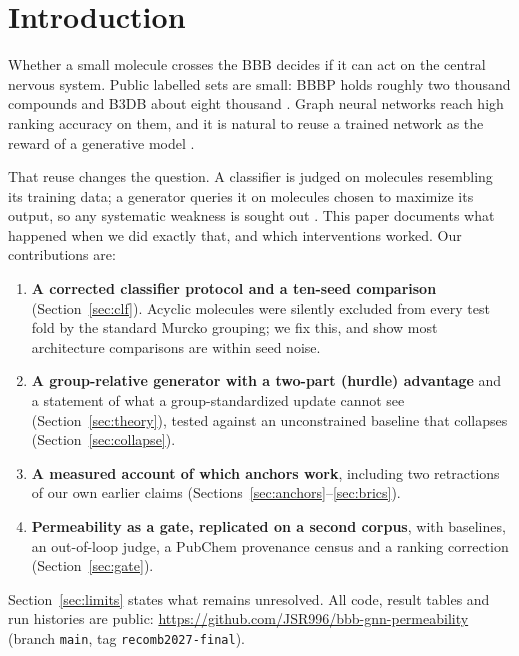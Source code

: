 \documentclass[10pt,letterpaper]{article}
\newcommand{\REPO}{\url{https://github.com/JSR996/bbb-gnn-permeability}}
\begin{document}
\section{Introduction}
Whether a small molecule crosses the BBB decides if it can act on the central nervous system. Public labelled sets are small: BBBP holds roughly two thousand compounds \cite{martins2012,wu2018} and B3DB about eight thousand \cite{meng2021}. Graph neural networks reach high ranking accuracy on them, and it is natural to reuse a trained network as the reward of a generative model \cite{olivecrona2017}.

That reuse changes the question. A classifier is judged on molecules resembling its training data; a generator queries it on molecules chosen to maximize its output, so any systematic weakness is sought out \cite{manheim2018,skalse2022,gao2022}. This paper documents what happened when we did exactly that, and which interventions worked. Our contributions are:
\begin{enumerate}[leftmargin=*,itemsep=1pt]
\item \textbf{A corrected classifier protocol and a ten-seed comparison} (Section~\ref{sec:clf}). Acyclic molecules were silently excluded from every test fold by the standard Murcko grouping; we fix this, and show most architecture comparisons are within seed noise.
\item \textbf{A group-relative generator with a two-part (hurdle) advantage} and a statement of what a group-standardized update cannot see (Section~\ref{sec:theory}), tested against an unconstrained baseline that collapses (Section~\ref{sec:collapse}).
\item \textbf{A measured account of which anchors work}, including two retractions of our own earlier claims (Sections~\ref{sec:anchors}--\ref{sec:brics}).
\item \textbf{Permeability as a gate, replicated on a second corpus}, with baselines, an out-of-loop judge, a PubChem provenance census and a ranking correction (Section~\ref{sec:gate}).
\end{enumerate}
Section~\ref{sec:limits} states what remains unresolved. All code, result tables and run histories are public: \REPO{} (branch \texttt{main}, tag \texttt{recomb2027-final}).
\end{document}
